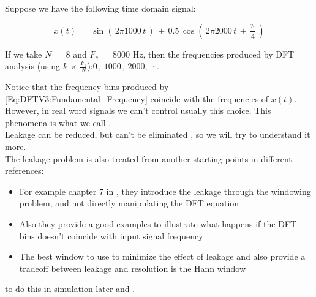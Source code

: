 \begin{itemize}
Suppose we have the following time domain signal:

\begin{equation}
x(t) \, = \, \sin{\left( \, 2 \pi 1000 \, t\,\right)} \, + \, 0.5 \, \cos{\left(\, 2 \pi 2000 \,t \, + \, \displaystyle\frac{\pi}{4}\,\right)}      
\end{equation}

If we take $N \, = \, 8$ and $F_s \, =\, 8000$ Hz, then the frequencies produced by DFT analysis (using $k \, \times \, \displaystyle\frac{F_s}{N}$):$0 \, , \, 1000\, ,\, 2000 , \, \cdots$.

Notice that the frequency bins produced by \autoref{Eq:DFTV3:Fundamental_Frequency} coincide with the  frequencies of $x(t)$. However, in real word signals we can't control usually this choice. This phenomena is what we call .\\

Leakage can be reduced, but can't be eliminated , so we will try to understand it more.\\

The leakage problem is also treated from another starting points in different references:

\begin{itemize}
    \item For example chapter 7 in \cite{DSP_DimitrisManolakis}, they introduce the leakage through the windowing problem, and not directly manipulating the DFT equation
    
    
    \item Also they provide a good examples to illustrate what happens if the DFT bins doesn't coincide with input signal frequency
    
    
    \item The best window to use to minimize the effect of leakage and also provide a tradeoff between leakage and resolution is the Hann window
    
    
\end{itemize}

 to do this in simulation later and .



    
\end{itemize}











